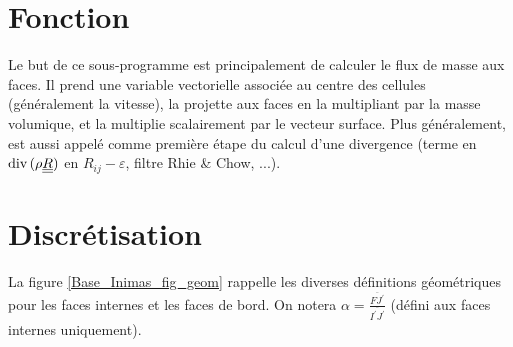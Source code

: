 
%
%
%
%



\vspace{1cm}
\section*{Fonction}
Le but de ce sous-programme est principalement de calculer le flux de masse aux
faces. Il prend une variable vectorielle associ\'ee au centre des cellules
(g\'en\'eralement la vitesse), la projette aux faces en la multipliant par la
masse volumique, et la multiplie scalairement par le vecteur surface.
Plus g\'en\'eralement,  est aussi appel\'e comme premi\`ere \'etape
du calcul d'une divergence (terme en $\text{div}\,(\rho\underline{\underline{R}})$ en
$R_{ij}-\varepsilon$, filtre Rhie \& Chow, ...).

\section*{Discr\'etisation}

La figure \ref{Base_Inimas_fig_geom} rappelle les diverses d\'efinitions g\'eom\'etriques
pour les faces internes et les faces de bord. On notera
$\displaystyle \alpha=\frac{\overline{FJ^\prime}}{\overline{I^\prime J^\prime}}$ (d\'efini aux faces
internes uniquement).

